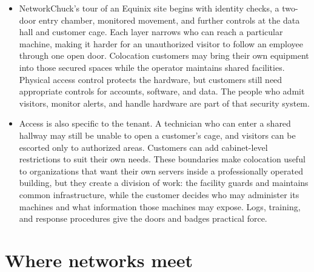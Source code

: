 \documentclass[10pt]{article}
\begin{document}
\begin{itemize}[leftmargin=1.25em, itemsep=0.3em, parsep=0pt, topsep=0pt]
    \item NetworkChuck's tour of an Equinix site begins with identity checks, a two-door entry chamber, monitored movement, and further controls at the data hall and customer cage. Each layer narrows who can reach a particular machine, making it harder for an unauthorized visitor to follow an employee through one open door. Colocation customers may bring their own equipment into those secured spaces while the operator maintains shared facilities. Physical access control protects the hardware, but customers still need appropriate controls for accounts, software, and data. The people who admit visitors, monitor alerts, and handle hardware are part of that security system.

    \item Access is also specific to the tenant. A technician who can enter a shared hallway may still be unable to open a customer's cage, and visitors can be escorted only to authorized areas. Customers can add cabinet-level restrictions to suit their own needs. These boundaries make colocation useful to organizations that want their own servers inside a professionally operated building, but they create a division of work: the facility guards and maintains common infrastructure, while the customer decides who may administer its machines and what information those machines may expose. Logs, training, and response procedures give the doors and badges practical force.
\end{itemize}

\section*{Where networks meet}
\end{document}
